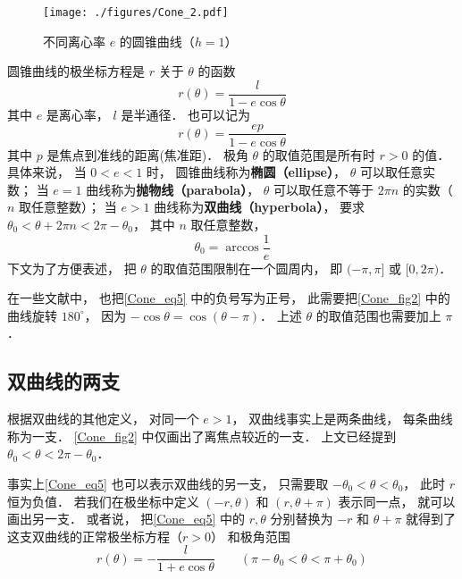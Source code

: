 

\begin{figure}[ht]
\centering
\texttt{[image: ./figures/Cone\_2.pdf]}
\caption{不同离心率 $e$ 的圆锥曲线（$h = 1$）} \label{Cone_fig2}
\end{figure}

圆锥曲线的极坐标方程是 $r$ 关于 $\theta$ 的函数
\begin{equation}\label{Cone_eq5}
r(\theta)  = \frac{l}{1 - e\cos \theta }
\end{equation}
其中 $e$ 是离心率， $l$ 是半通径． 也可以记为
\begin{equation}\label{Cone_eq3}
r(\theta) = \frac{ep}{1 - e\cos \theta }
\end{equation}
其中 $p$ 是焦点到准线的距离(焦准距)． 极角 $\theta$ 的取值范围是所有时 $r>0$ 的值． 具体来说， 当 $0 < e < 1$ 时， 圆锥曲线称为\textbf{椭圆（ellipse）}， $\theta$ 可以取任意实数； 当 $e = 1$ 曲线称为\textbf{抛物线（parabola）}， $\theta$ 可以取任意不等于 $2\pi n$ 的实数（$n$ 取任意整数）； 当 $e > 1$ 曲线称为\textbf{双曲线（hyperbola）}， 要求 $\theta_0< \theta + 2\pi n < 2\pi-\theta_0$， 其中 $n$ 取任意整数，
\begin{equation}
\theta_0 = \arccos\frac{1}{e}
\end{equation}
下文为了方便表述， 把 $\theta$ 的取值范围限制在一个圆周内， 即 $(-\pi,\pi]$ 或 $[0, 2\pi)$．

在一些文献中， 也把\autoref{Cone_eq5} 中的负号写为正号， 此需要把\autoref{Cone_fig2} 中的曲线旋转 $180^\circ$， 因为 $-\cos\theta = \cos(\theta - \pi)$． 上述 $\theta$ 的取值范围也需要加上 $\pi$．

\subsection{双曲线的两支}
根据双曲线的其他定义， 对同一个 $e>1$， 双曲线事实上是两条曲线， 每条曲线称为一支． \autoref{Cone_fig2} 中仅画出了离焦点较近的一支． 上文已经提到 $\theta_0< \theta < 2\pi-\theta_0$．

事实上\autoref{Cone_eq5} 也可以表示双曲线的另一支， 只需要取 $-\theta_0< \theta < \theta_0$， 此时 $r$ 恒为负值． 若我们在极坐标中定义 $(-r, \theta)$ 和 $(r, \theta + \pi)$ 表示同一点， 就可以画出另一支． 或者说， 把\autoref{Cone_eq5} 中的  $r,\theta$ 分别替换为 $-r$ 和 $\theta+\pi$ 就得到了这支双曲线的正常极坐标方程（$r > 0$） 和极角范围
\begin{equation}\label{Cone_eq6}
r(\theta) = -\frac{l}{1 + e\cos\theta} \qquad (\pi - \theta_0<\theta < \pi + \theta_0)
\end{equation}

